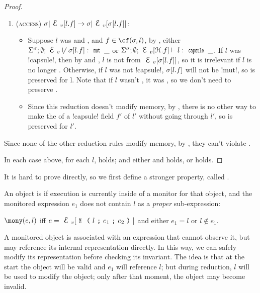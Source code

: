 \begin{proof}
\begin{ienumerate}
\begin{enumerate}
		
		\item (\textsc{access}) $\s|\EV[l.f]\rightarrow \s|\EV[\s[l.f]]$:
		\begin{itemize}
			\item Suppose $l$ was \WE and \NCM, and $f \in \cf(\s, l)$, by , either $\Ss; \emptyset; \EV \nvdash \s[l.f] : \Kw{mut}\,\_$ or $\Ss; \emptyset; \EV[\h.f] \vdash l : \Kw{capsule}\,\_$. If $l$ was \Q!capsule!, then by  and \HNC, $l$ is not \reach from $\EV[\s[l.f]]$, so it is irrelevant if $l$ is no longer \WE. Otherwise, if $l$ was not \Q!capsule!, $\sigma[l.f]$ will not be \Q!mut!, so \WE is preserved for l. Note that if $l$ wasn't \NCM, it was \HNO, so we don't need to preserve \WE. 
			\item Since this reduction doesn't modify memory, by , there is no other way to make the \rog of a \Q!capsule! field $f'$ of $l'$ \muty without going through $l'$, so \WE is preserved for $l'$.
		\end{itemize}
	\end{enumerate}
	
	\item Since none of the other reduction rules modify memory, by , they can't violate \WE.
	
\end{ienumerate}

\noindent In each case above, for each $l$, \HNC holds; and either \WE and \NCM holds, or \HNO holds.
\end{proof}

It is hard to prove  directly,
so we first define a stronger property,
called .

An object is \mony if execution
is currently inside of a monitor for that object, and
the monitored expression $e_1$ does not
contain $l$ as a \emph{proper} sub-expression:

\indent $\mony(e,l)$ iff
$e=\EV[\M{l}{e_1}{e_2}]$ and either $e_1=l$ or $l \notin e_1$.%

\noindent A monitored object is associated with an expression that cannot observe it, but may
reference its internal representation directly.
In this way, we can safely modify its representation before checking its invariant.
The idea is that at the start the object will be valid and $e_1$ will reference $l$;
but during reduction, $l$ will be used to
modify the object; only after that moment, the object may become invalid.

